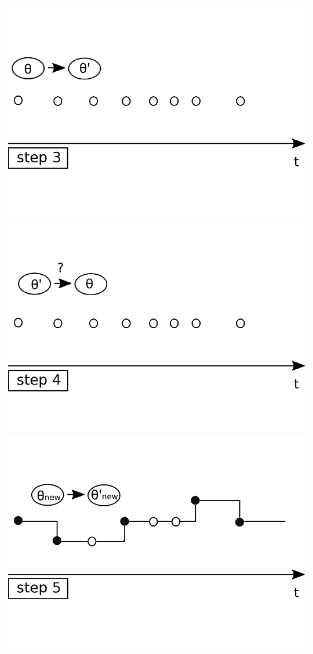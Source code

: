 \begin{figure}[H]
\begin{minipage}[hp]{0.45\linewidth}
    \vspace{-0 in}
  \end{minipage}
  \begin{minipage}[hp]{0.45\linewidth}
  \centering
    \includegraphics [width=0.70\textwidth, angle=0]{figs/plot3.pdf}
    \vspace{-0 in}
  \end{minipage}
  \begin{minipage}[hp]{0.45\linewidth}
  \centering
    \includegraphics [width=0.70\textwidth, angle=0]{figs/plot4.pdf}
    \vspace{-0 in}
  \end{minipage}
  \begin{minipage}[hp]{0.45\linewidth}
  \centering
    \includegraphics [width=0.70\textwidth, angle=0]{figs/plot5.pdf}

\end{minipage}
\end{figure}

